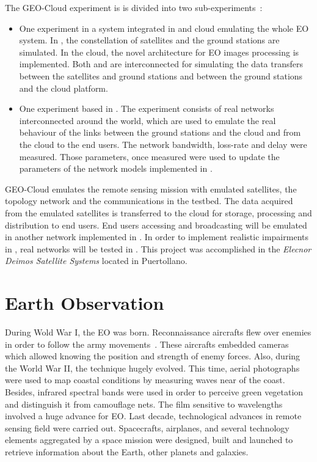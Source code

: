 The GEO-Cloud experiment is is divided into two sub-experiments~\cite{Perez2014}:
\begin{itemize}
\item One experiment in a system integrated in \vw and \bonfire cloud emulating
  the whole \ac{EO} system. In \vw, the constellation of satellites and the
  ground stations are simulated. In the \bonfire cloud, the novel architecture
  for \ac{EO} images processing is implemented. Both \vw and \bonfire are
  interconnected for simulating the data transfers between the satellites and
  ground stations and between the ground stations and the cloud platform.
\item One experiment based in \pl. The experiment consists of real networks
  interconnected around the world, which are used to emulate the real behaviour
  of the links between the ground stations and the cloud and from the cloud to
  the end users. The network bandwidth, loss-rate and delay were measured. Those
  parameters, once measured were used to update the parameters of the network
  models implemented in \vw.
\end{itemize}

GEO-Cloud  emulates the remote sensing mission with emulated satellites, the
topology network and the communications in the \vw testbed. The data
acquired from the emulated satellites is transferred to the \bonfire cloud
for storage, processing and distribution to end users. End users accessing and
broadcasting will be emulated in another network implemented in \vw. In
order to implement realistic impairments in \vw, real networks will be
tested in \pl. This project was accomplished in the \emph{Elecnor Deimos
  Satellite Systems} located in Puertollano. 

\section{Earth Observation}

During Wold War I, the \ac{EO} was born. Reconnaissance aircrafts flew over enemies in order to follow
the army movements~\cite{ESA2009}. These aircrafts embedded cameras which allowed knowing the position and strength of enemy forces. Also, during the World War II, the
technique hugely evolved. This time, aerial photographs were used to map coastal
conditions by measuring waves near of the coast. Besides, infrared spectral bands
were used in order to perceive  green vegetation and distinguish it from
camouflage nets. The film sensitive to wavelengths involved a huge advance for \ac{EO}.
Last decade, technological advances in remote sensing field were carried out. Spacecrafts, airplanes, and several technology
elements aggregated by a space mission were designed, built and launched to
retrieve information about the Earth, other planets and galaxies.


